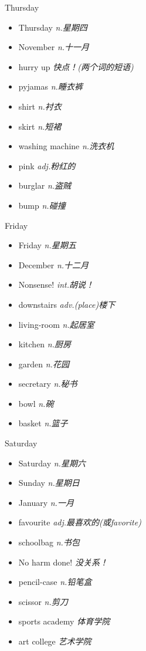 \documentclass{ctexart}
\begin{document}
\begin{multicols}{2}
\begin{textbox}{Thursday}
\begin{itemize}
    \item Thursday \emph{n.星期四}
    \item November \emph{n.十一月}
    \item hurry up \emph{快点！(两个词的短语)}
    \item pyjamas \emph{n.睡衣裤}
    \item shirt \emph{n.衬衣}
    \item skirt \emph{n.短裙}
    \item washing machine \emph{n.洗衣机}
    \item pink \emph{adj.粉红的}
    \item burglar \emph{n.盗贼}
    \item bump \emph{n.碰撞}
\end{itemize}
\end{textbox}

\begin{textbox}{Friday}
\begin{itemize}
    \item Friday \emph{n.星期五}
    \item December \emph{n.十二月}
    \item Nonsense! \emph{int.胡说！}
    \item downstairs \emph{adv.(place)楼下}
    \item living-room \emph{n.起居室}
    \item kitchen \emph{n.厨房}
    \item garden \emph{n.花园}
    \item secretary \emph{n.秘书}
    \item bowl \emph{n.碗}
    \item basket \emph{n.篮子}
\end{itemize}
\end{textbox}

\begin{textbox}{Saturday}
\begin{itemize}
    \item Saturday \emph{n.星期六}
    \item Sunday \emph{n.星期日}
    \item January \emph{n.一月}
    \item favourite \emph{adj.最喜欢的(或favorite)}
    \item schoolbag \emph{n.书包}
    \item No harm done! \emph{没关系！}
    \item pencil-case \emph{n.铅笔盒}
    \item scissor \emph{n.剪刀}
    \item sports academy \emph{体育学院}
    \item art college \emph{艺术学院}
\end{itemize}
\end{textbox}
\end{multicols}
\end{document}
